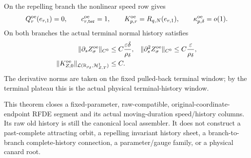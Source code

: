 \begin{theorem}
On the repelling branch the nonlinear speed row gives
\begin{equation}
 Q_r^{\rm oe}(e_{r,1})=0,\qquad
 c_{r,\rm ter}^{\rm oe}=1,\qquad
 K_{p,r}^{\rm oe}=R_{q,N}(e_{r,1}),\qquad
 \kappa_{p,\delta}^{\rm oe}=o(1).               \label{eq:short-clock-endpoint-speed-identities}
\end{equation}
On both branches the actual terminal normal history satisfies
\begin{align}
 \|\partial_s Z_\sigma^{\rm oe}\|_{C^0}
 &\le C\frac{\varepsilon\delta}{\rho_\delta},&
 \|\partial_s^2 Z_\sigma^{\rm oe}\|_{C^0}
 &\le C\frac{\varepsilon}{\rho_\delta},          \label{eq:short-clock-endpoint-slow-jet}\\
 \|K_{Z,0}^{\rm oe}\|_
  {\mathcal L(\mathbb R_{\rho_\delta},\mathcal H_{Z,T}^1)}
 &\le C.                                         \label{eq:short-clock-actual-history-shear}
\end{align}
The derivative norms are taken on the fixed pulled-back terminal window;
by the terminal plateau this is the actual physical terminal-history
window.

This theorem closes a fixed-parameter, raw-compatible,
original-coordinate-endpoint RFDE segment and its actual moving-duration
speed/history columns.  Its raw old history is still the canonical local
assembler.  It does not construct a past-complete attracting orbit, a
repelling invariant history sheet, a branch-to-branch complete-history
connection, a parameter/gauge family, or a physical canard root.
\end{theorem}

